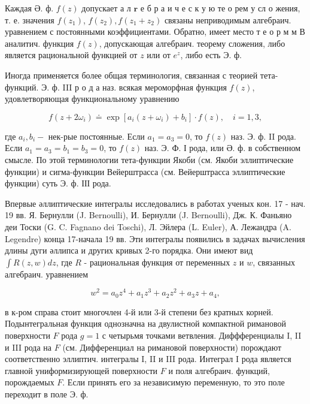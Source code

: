 \documentclass[10pt]{article}
\begin{document}
Каждая Ә. ф. $f(z)$ допускает а л $\mathbf{r}$ е б р а и ч е с к у ю те о рем у сл о жения, т. е. значения $f\left(z_{1}\right)$, $f\left(z_{2}\right), f\left(z_{1}+z_{2}\right)$ связаны неприводимым алгебраич. уравнением с постоянными коэффициентами. Обратно, имеет место т е о р м м В аналитич. функция $f(z)$, допускающая алгебраич. теорему сложения, либо является рациональной функцией от $z$ или от $e^{z}$, либо есть Э. ф.



Иногда применяется более общая терминология, связанная с теорией тета-функций. Э. ф. III р о д а наз. всякая мероморфная функция $f(z)$, удовлетворяющая функциональному уравнению



\[

f\left(z+2 \omega_{i}\right) \doteq \exp \left[a_{i}\left(z+\omega_{i}\right)+b_{i}\right] \cdot f(z), \quad i=1,3,

\]



где $a_{i}, b_{i}-$ нек-рые постоянные. Если $a_{1}=a_{3}=0$, то $f(z)$ наз. Э. ф. II рода. Если $a_{1}=a_{3}=b_{1}=b_{3}=0$, то $f(z)$ наз. Э. Ф. І рода, или Ә. ф. в собственном смысле. По этой терминологии тета-функции Якоби (см. Якоби эллиптические функции) и сигма-функции Вейерштрасса (см. Вейерштрасса эллиптические функции) суть Э. ф. ІІІ рода.



Впервые әллиптические интегралы исследовались в работах ученых кон. 17 - нач. 19 вв. Я. Бернулли (J. Bernoulli), И. Бернулли (J. Bernoulli), Дж. К. Фаньяно деи Тоски (G. C. Fagnano dei Toschi), Л. Эйлера (L. Euler), А. Лежандра (A. Legendre) конца 17-начала 19 вв. Эти интегралы появились в задачах вычисления длины дуги әллипса и других кривых 2-го порядка. Они имеют вид $\int R(z, w) d z$, где $R$ - рациональная функция от переменных $z$ и $w$, связанных алгебраич. уравнением



\[

w^{2}=a_{0} z^{4}+a_{1} z^{3}+a_{2} z^{2}+a_{3} z+a_{4},

\]



в к-ром справа стоит многочлен 4-й или 3-й степени без кратных корней. Подынтегральная функция однозначна на двулистной компактной римановой поверхности $F$ рода $g=1$ с четырьмя точками ветвления. Диффференциалы I, II и III рода на $F$ (см. Дифференциал на римановой поверхности) порождают соответственно эллиптич. интегралы I, II и III рода. Интеграл I рода является главной униформизирующей поверхности $F$ и поля алгебраич. функций, порождаемых $F$. Если принять его за независимую переменную, то это поле переходит в поле Э. ф.
\end{document}
